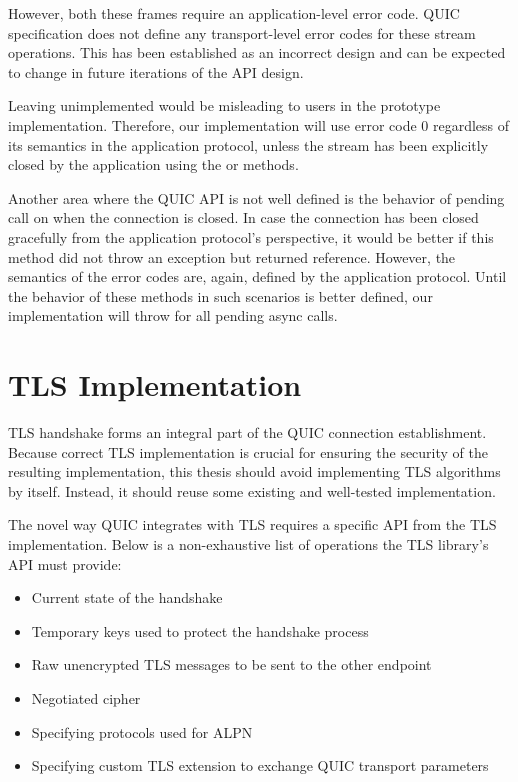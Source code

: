 However, both these frames require an application-level error code. QUIC specification does not
define any transport-level error codes for these stream operations. This has been established as an
incorrect design and can be expected to change in future iterations of the API design.

Leaving  unimplemented would be misleading to users in the prototype
implementation. Therefore, our implementation will use error code 0 regardless of its semantics in
the application protocol, unless the stream has been explicitly closed by the application using the
 or  methods.

Another area where the QUIC API is not well defined is the behavior of pending 
call on \QuicConnection{} when the connection is closed. In case the connection has been closed
gracefully from the application protocol's perspective, it would be better if this method did not
throw an exception but returned  reference. However, the semantics of the error codes
are, again, defined by the application protocol. Until the behavior of these methods in such
scenarios is better defined, our implementation will throw
 for all pending async calls.

\section{TLS Implementation}

TLS handshake forms an integral part of the QUIC connection establishment. Because correct TLS
implementation is crucial for ensuring the security of the resulting implementation, this thesis
should avoid implementing TLS algorithms by itself. Instead, it should reuse some existing and
well-tested implementation.

The novel way QUIC integrates with TLS requires a specific API from the TLS implementation. Below is
a non-exhaustive list of operations the TLS library's API must provide:

\begin{itemize}

  \item Current state of the handshake

  \item Temporary keys used to protect the handshake process

  \item Raw unencrypted TLS messages to be sent to the other endpoint

  \item Negotiated cipher

  \item Specifying protocols used for ALPN

  \item Specifying custom TLS extension to exchange QUIC transport parameters

\end{itemize}

